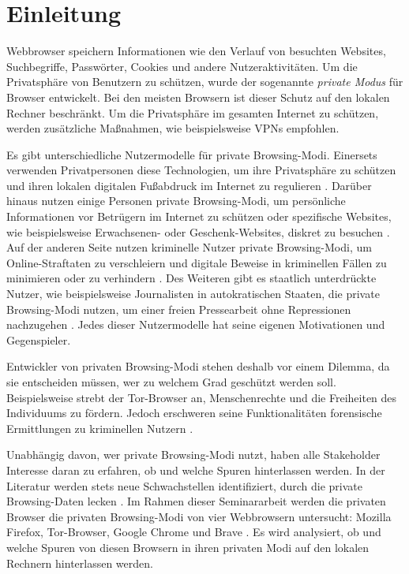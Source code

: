 \chapter{Einleitung}
Webbrowser speichern Informationen wie den Verlauf von besuchten Websites, Suchbegriffe, Passwörter, Cookies und andere Nutzeraktivitäten. 
Um die Privatsphäre von Benutzern zu schützen, wurde der sogenannte \textit{private Modus} für Browser entwickelt.
Bei den meisten Browsern ist dieser Schutz auf den lokalen Rechner beschränkt. \cite{Rochmadi.2017} Um die Privatsphäre im gesamten Internet zu schützen, werden zusätzliche Maßnahmen, wie beispielsweise VPNs empfohlen. \cite{Perdices.2023}

Es gibt unterschiedliche Nutzermodelle für private Browsing-Modi. Einersets verwenden Privatpersonen diese Technologien, um ihre Privatsphäre zu schützen und ihren lokalen digitalen Fußabdruck im Internet zu regulieren \cite{Horsman.2019}. Darüber hinaus nutzen einige Personen private Browsing-Modi, um persönliche Informationen vor Betrügern im Internet zu schützen oder spezifische Websites, wie beispielsweise Erwachsenen- oder Geschenk-Websites, diskret zu besuchen \cite{Aggarwal.2010}. Auf der anderen Seite nutzen kriminelle Nutzer private Browsing-Modi, um Online-Straftaten zu verschleiern und digitale Beweise in kriminellen Fällen zu minimieren oder zu verhindern \cite{Montasari.2015, Rochmadi.2017}. Des Weiteren gibt es staatlich unterdrückte Nutzer, wie beispielsweise Journalisten in autokratischen Staaten, die private Browsing-Modi nutzen, um einer freien Pressearbeit ohne Repressionen nachzugehen \cite{Rathod.2017}. Jedes dieser Nutzermodelle hat seine eigenen Motivationen und Gegenspieler.

Entwickler von privaten Browsing-Modi stehen deshalb vor einem Dilemma, da sie entscheiden müssen, wer zu welchem Grad geschützt werden soll. Beispielsweise strebt der Tor-Browser an, Menschenrechte und die Freiheiten des Individuums zu fördern. \cite{Tor.24.05.2023}
Jedoch erschweren seine Funktionalitäten forensische Ermittlungen zu kriminellen Nutzern \cite{Muir.2019, Rathod.2017}.

Unabhängig davon, wer private Browsing-Modi nutzt, haben alle Stakeholder Interesse daran zu erfahren, ob und welche Spuren hinterlassen werden. In der Literatur werden stets neue Schwachstellen identifiziert, durch die private Browsing-Daten \glqq{}lecken\grqq{} \cite{Satvat.2014}.
Im Rahmen dieser Seminararbeit werden die privaten Browser die privaten Browsing-Modi von vier Webbrowsern untersucht: Mozilla Firefox, Tor-Browser, Google Chrome und Brave \cite{Montasari.2015}. Es wird analysiert, ob und welche Spuren von diesen Browsern in ihren privaten Modi auf den lokalen Rechnern hinterlassen werden.
